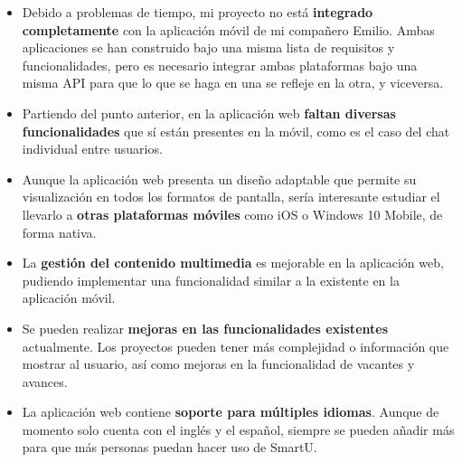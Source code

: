 \begin{itemize}
    \item Debido a problemas de tiempo, mi proyecto no está \textbf{integrado completamente} con la aplicación móvil de mi compañero Emilio. Ambas aplicaciones se han construido bajo una misma lista de requisitos y funcionalidades, pero es necesario integrar ambas plataformas bajo una misma API para que lo que se haga en una se refleje en la otra, y viceversa.
    \item Partiendo del punto anterior, en la aplicación web \textbf{faltan diversas funcionalidades} que sí están presentes en la móvil, como es el caso del chat individual entre usuarios.
    \item Aunque la aplicación web presenta un diseño adaptable que permite su visualización en todos los formatos de pantalla, sería interesante estudiar el llevarlo a \textbf{otras plataformas móviles} como iOS o Windows 10 Mobile, de forma nativa.
    \item La \textbf{gestión del contenido multimedia} es mejorable en la aplicación web, pudiendo implementar una funcionalidad similar a la existente en la aplicación móvil.
    \item Se pueden realizar \textbf{mejoras en las funcionalidades existentes} actualmente. Los proyectos pueden tener más complejidad o información que mostrar al usuario, así como mejoras en la funcionalidad de vacantes y avances.
    \item La aplicación web contiene \textbf{soporte para múltiples idiomas}. Aunque de momento solo cuenta con el inglés y el español, siempre se pueden añadir más para que más personas puedan hacer uso de SmartU.
\end{itemize}
